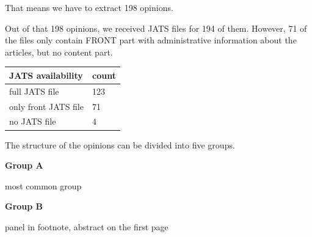\documentclass[12pt]{article}
\begin{document}
That means we have to extract 198 opinions.

Out of that 198 opinions, we received JATS files for 194 of them.
However, 71 of the files only contain FRONT part with administrative information about the articles, but no content part.
\begin{center}
    \begin{tabular}{| l | l |}
    \hline
    \textbf{JATS availability} & \textbf{count} \\
    \hline
    full JATS file & 123 \\ 
    only front JATS file & 71 \\  
    no JATS file & 4 \\
    \hline
    \end{tabular}
\end{center}

The structure of the opinions can be divided into five groups.

\textbf{Group A}

most common group



\textbf{Group B}

panel in footnote, abstract on the first page
\end{document}
